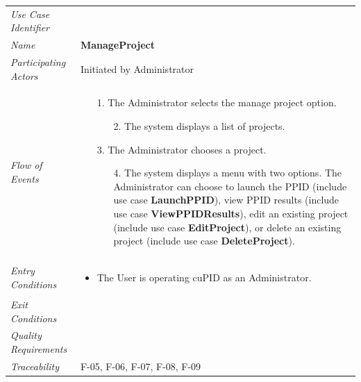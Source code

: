 \documentclass[12pt,letterpaper]{article}
\begin{document}
\begin{center}
    \begin{tabu} to 
        \toprule
		Use Case Identifier & \manageproject{} \\
		Name & {\bf ManageProject} \\
        Participating Actors & Initiated by Administrator \\
		Flow of Events & 
		\begin{minipage}[t]{\linewidth}
		    \begin{enumerate}
			    \item[1.] The Administrator selects the manage project option.
			    \begin{enumerate}
			        \item[2.] The system displays a list of projects.
				\end{enumerate}
				\item[3.] The Administrator chooses a project.
				\begin{enumerate}
				    \item[4.] The system displays a menu with two options. The Administrator can choose to launch the PPID (include use case \textbf{LaunchPPID}), view PPID results (include use case \textbf{ViewPPIDResults}), edit an existing project (include use case \textbf{EditProject}), or delete an existing project (include use case \textbf{DeleteProject}).
				\end{enumerate}
			\end{enumerate}
	    \end{minipage} \\

		Entry Conditions &
		\begin{minipage}[t]{\linewidth}
			\begin{itemize}
			    \item The User is operating cuPID as an Administrator.
	        \end{itemize}
	    \end{minipage} \\

		Exit Conditions & \\

		Quality Requirements & \\

		Traceability & F-05, F-06, F-07, F-08, F-09\\
        \toprule
    \end{tabu}
\end{center}
\end{document}
